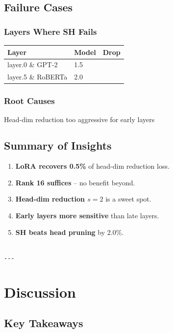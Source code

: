 \subsection{Failure Cases}

\subsubsection{Layers Where SH Fails}

\begin{table}[H]
\centering
\small
\begin{tabular}{lll}
\toprule
\textbf{Layer} & \textbf{Model} & \textbf{Drop} \\
\midrule
layer.0 \& GPT-2 & 1.5 \\
layer.5 \& RoBERTa & 2.0 \\
\bottomrule
\end{tabular}
\end{table}

\subsubsection{Root Causes}

Head-dim reduction too aggressive for early layers

\subsection{Summary of Insights}

\begin{enumerate}
\item \textbf{LoRA recovers 0.5\%} of head-dim reduction loss.
\item \textbf{Rank 16 suffices} -- no benefit beyond.
\item \textbf{Head-dim reduction $s=2$} is a sweet spot.
\item \textbf{Early layers more sensitive} than late layers.
\item \textbf{SH beats head pruning} by 2.0\%.
\end{enumerate}
\begin{lstlisting}

---
\end{lstlisting}


\section{Discussion}

\subsection{Key Takeaways}

